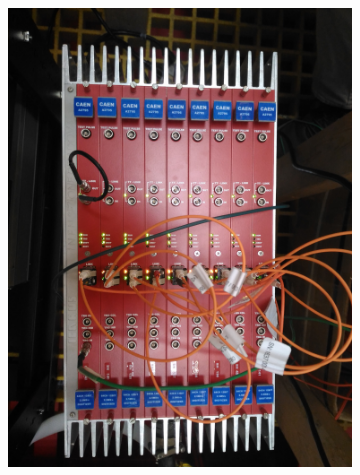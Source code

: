 \begin{figure}
  \begin{subfigure}{0.45\linewidth}
    \includegraphics[width=\textwidth]{figures/ReadoutCrate-standard}
    \label{fig:StandardMinicrate}
  \end{subfigure}
  \begin{subfigure}{0.55\linewidth}

\end{subfigure}
\end{figure}
